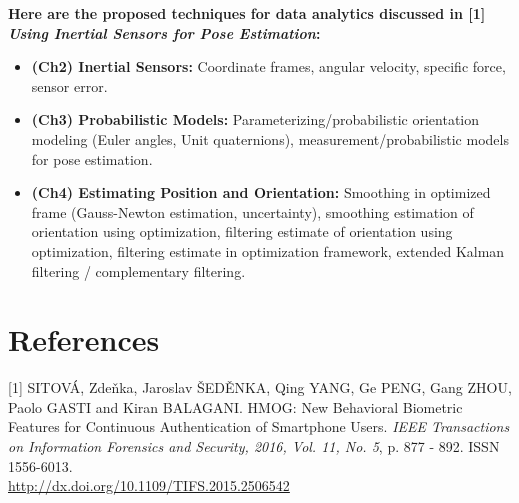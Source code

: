 \documentclass{article}
\begin{document}
\textbf{Here are the proposed techniques for data analytics discussed
in [1] \textit{Using Inertial Sensors for Pose Estimation}:}

\begin{itemize}
  \item \textbf{(Ch2) Inertial Sensors:} Coordinate frames, angular
    velocity, specific force, sensor error.
  \item \textbf{(Ch3) Probabilistic Models:} Parameterizing/probabilistic
    orientation modeling (Euler angles, Unit quaternions),
    measurement/probabilistic models for pose estimation.
  \item \textbf{(Ch4) Estimating Position and Orientation:} Smoothing
    in optimized frame (Gauss-Newton estimation, uncertainty),
    smoothing estimation of orientation using optimization, filtering
    estimate of orientation using optimization, filtering estimate in
    optimization framework, extended Kalman filtering / complementary
    filtering.
\end{itemize}

\section*{References}

\small

[1] SITOVÁ, Zdeňka, Jaroslav ŠEDĚNKA, Qing YANG, Ge PENG, Gang ZHOU,
Paolo GASTI and Kiran BALAGANI. HMOG: New Behavioral Biometric Features
for Continuous Authentication of Smartphone Users. {\it IEEE Transactions on
Information Forensics and Security, 2016, Vol. 11, No. 5}, p. 877 - 892.
ISSN 1556-6013. \\ \url{http://dx.doi.org/10.1109/TIFS.2015.2506542}
\end{document}
